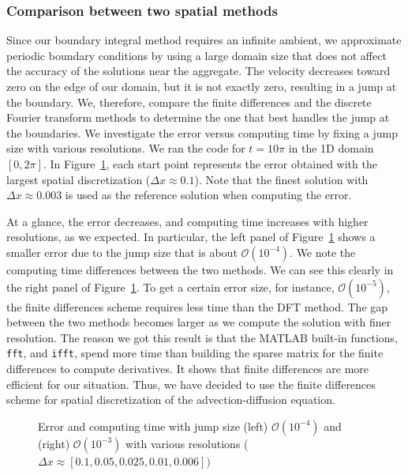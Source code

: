 \subsubsection{Comparison between two spatial methods}
Since our boundary integral method requires an infinite ambient, we approximate periodic boundary conditions by using a large domain size that does not affect the accuracy of the solutions near the aggregate. The velocity decreases toward zero on the edge of our domain,
but it is not exactly zero, resulting in a jump at the boundary.
We, therefore, compare the finite differences and the discrete Fourier transform methods to determine the one that best handles the jump at the boundaries. We investigate the error versus computing time by fixing a jump size with various resolutions. We ran the code for $t = 10 \pi$ in the 1D domain $[0, 2\pi].$ In Figure~\ref{fig_precision}, each start point represents the error obtained with the largest spatial discretization ($\Delta x \approx 0.1$). Note that the finest solution with $\Delta x \approx 0.003$ is used as the reference solution when computing the error. 
\par
At a glance, the error decreases, and computing time increases with higher resolutions, as we expected. In particular, the left panel of Figure~\ref{fig_precision} shows a smaller error due to the jump size that is about $\mathcal{O}(10^{-4})$.
We note the computing time differences between the two methods. We can see this clearly in the right panel of Figure~\ref{fig_precision}. To get a certain error size, for instance, $\mathcal{O}(10^{-5})$, the finite differences scheme requires less time than the DFT method. The gap between the two methods becomes larger as we compute the solution with finer resolution.  
The reason we got this result is that the MATLAB built-in functions, \verb+fft+, and \verb+ifft+, spend more time than building the sparse matrix for the finite differences to compute derivatives. It shows that finite differences are more efficient for our situation. 
Thus, we have decided to use the finite differences scheme for spatial discretization of the advection-diffusion equation.
\begin{figure}[ht]
	\begin{center}
	\end{center}
	\caption{Error and computing time with jump size (left) $\mathcal{O}(10^{-4})$ and (right) $\mathcal{O}(10^{-3})$ with various resolutions ($\Delta x \approx [0.1, 0.05, 0.025, 0.01, 0.006])$}
	\label{fig_precision}
\end{figure}

